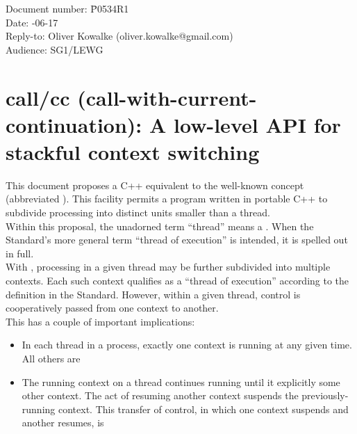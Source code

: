 \documentclass[fontsize=10pt,paper=A4,pagesize,DIV=15]{scrartcl}
\begin{document}
\small
\begin{tabbing}
    Document number: \= P0534R1\\
    Date:            -06-17\\
    Reply-to:        \> Oliver Kowalke (oliver.kowalke@gmail.com)\\
    Audience:        \> SG1/LEWG\\
\end{tabbing}

\section*{call/cc (call-with-current-continuation): A low-level API for stackful context switching}


\tableofcontents


This document proposes a C++ equivalent to the well-known concept
 (abbreviated ). This
facility permits a program written in portable C++ to subdivide processing into
distinct  units smaller than a thread.\\

Within this proposal, the unadorned term ``thread'' means a .
When the Standard's more general term ``thread of execution'' is intended, it
is spelled out in full.\\

With \cc, processing in a given thread may be further subdivided into multiple
contexts. Each such context qualifies as a ``thread of execution'' according
to the definition in the Standard. However, within a given thread, control is
cooperatively passed from one context to another.\\

This has a couple of important implications:

\begin{itemize}
\item In each thread in a process, exactly one context is running at any given
  time. All others are 
\item The running context on a thread continues running until it explicitly
   some other context. The act of resuming another context
  suspends the previously-running context. This transfer of control, in which
  one context suspends and another resumes, is 
\end{itemize}
\end{document}
